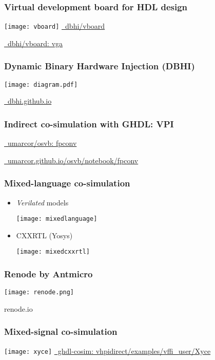 \documentclass[xcolor={usenames,dvipsnames}]{beamer}
\begin{document}
\begin{frame}
\frametitle{Virtual development board for HDL design}
\centering
\vfill
\texttt{[image: vboard]}
\vfill
\Large \href{https://github.com/dbhi/vboard}{\faGithub~dbhi/vboard}

\href{https://github.com/dbhi/vboard/tree/main/vga}{\faCode~dbhi/vboard: vga}
\vfill
\end{frame}

\begin{frame}
\frametitle{Dynamic Binary Hardware Injection (DBHI)}
\centering
\texttt{[image: diagram.pdf]}

\vfill
\Large\href{https://dbhi.github.io/}{\faGlobe~dbhi.github.io}
\end{frame}

\begin{frame}
\frametitle{Indirect co-simulation with GHDL: VPI}
\centering
\Large

\href{https://github.com/umarcor/osvb/tree/main/fpconv}{\faCode~umarcor/osvb: fpconv}

\href{https://umarcor.github.io/osvb/notebook/fpconv.html}{\faGlobe~umarcor.github.io/osvb/notebook/fpconv}

\end{frame}

\begin{frame}
\frametitle{Mixed-language co-simulation}

\begin{itemize}
  \item \emph{Verilated} models

    \vfill
    \texttt{[image: mixedlanguage]}
    \vfill

  \item CXXRTL (Yosys)

    \vfill
    \texttt{[image: mixedcxxrtl]}
    \vfill
\end{itemize}
\end{frame}

\begin{frame}
  \frametitle{Renode by Antmicro}
  \centering
  \texttt{[image: renode.png]}

  \vfill
  \Large
  renode.io
  \href{https://renode.io/}{\faGlobe}
  \href{https://docs.google.com/presentation/d/1j0gjI4pVkgF9CWvxaxr5XuCKakEB25YX2n-iFxlYKnE}{\faSlideshare}
\end{frame}

\begin{frame}
\frametitle{Mixed-signal co-simulation}
\centering
\texttt{[image: xyce]}
\vfill
\Large
\href{https://ghdl.github.io/ghdl-cosim/vhpidirect/examples/vffi_user.html\#xyce}{\faGlobe~ghdl-cosim: vhpidirect/examples/vffi\_user/Xyce}
\end{frame}
\end{document}

